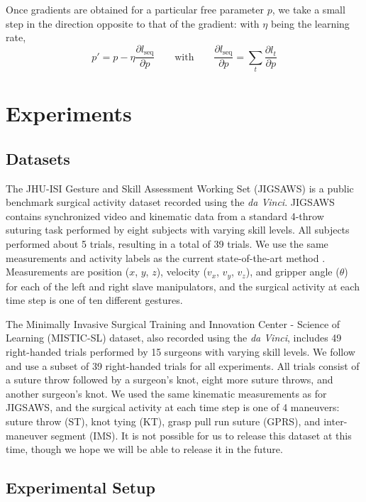 \documentclass{llncs}
\begin{document}
Once gradients are obtained for a particular free parameter $p$, we take a small step in the direction opposite to that of the gradient: with $\eta$ being the learning rate,
\begin{equation*}
p' = p - \eta \frac{\partial l_{\mbox{seq}}}{\partial p} \qquad \mbox{with} \qquad \frac{\partial l_{\mbox{seq}}}{\partial p} = \sum_t \frac{\partial l_t}{\partial p}
\end{equation*}

\section{Experiments}

\subsection{Datasets}

The JHU-ISI Gesture and Skill Assessment Working Set (JIGSAWS) \cite{gao2014} is a public benchmark surgical activity dataset recorded using the \emph{da Vinci}. JIGSAWS contains synchronized video and kinematic data from a standard 4-throw suturing task performed by eight subjects with varying skill levels. All subjects performed about 5 trials, resulting in a total of 39 trials. We use the same measurements and activity labels as the current state-of-the-art method \cite{lea2016learning}. Measurements are position ($x$, $y$, $z$), velocity ($v_x$, $v_y$, $v_z$), and gripper angle ($\theta$) for each of the left and right slave manipulators, and the surgical activity at each time step is one of ten different gestures.

The Minimally Invasive Surgical Training and Innovation Center - Science of Learning (MISTIC-SL) dataset, also recorded using the \emph{da Vinci}, includes 49 right-handed trials performed by 15 surgeons with varying skill levels. We follow \cite{gao2016unsupervised} and use a subset of 39 right-handed trials for all experiments. All trials consist of a suture throw followed by a surgeon's knot, eight more suture throws, and another surgeon's knot. We used the same kinematic measurements as for JIGSAWS, and the surgical activity at each time step is one of 4 maneuvers: suture throw (ST), knot tying (KT), grasp pull run suture (GPRS), and inter-maneuver segment (IMS). It is not possible for us to release this dataset at this time, though we hope we will be able to release it in the future.

\subsection{Experimental Setup}
\end{document}
